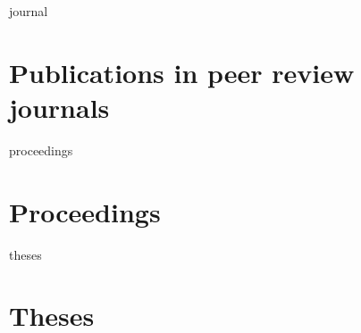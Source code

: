 \documentclass[10pt,a4paper]{scrartcl}
\begin{document}
\medskip

\begingroup

\begin{btSect}{journal}
\section*{Publications in peer review journals}
\btPrintAll
\end{btSect}
\medskip

\begin{btSect}{proceedings}
\section*{Proceedings}
\btPrintAll
\end{btSect}
\medskip

\begin{btSect}{theses}
\section*{Theses}
\btPrintAll
\end{btSect}	  

\nocite{*}

\endgroup  
	  
%	
%	 
\end{document}
